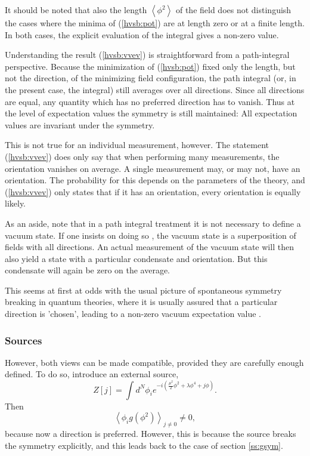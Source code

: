 \documentclass[final,twoside,12pt]{article}
\newcommand*{\no}{\noindent}
\newcommand*{\be}{\begin{equation}}
\newcommand*{\ee}{\end{equation}}
\newcommand*{\pref}[1]{(\ref{#1})}
\newcommand*{\nn}{\nonumber}
\newcommand*{\1}{1\!\!\!\bot}
\newcommand*{\la}{\left\langle}
\newcommand*{\ra}{\right\rangle}
\begin{document}
It should be noted that also the length $\la\phi^2\ra$ of the field does not distinguish the cases where the minima of \pref{hvsb:pot} are at length zero or at a finite length. In both cases, the explicit evaluation of the integral gives a non-zero value.

Understanding the result \pref{hvsb:vvev} is straightforward from a path-integral perspective. Because the minimization of \pref{hvsb:pot} fixed only the length, but not the direction, of the minimizing field configuration, the path integral (or, in the present case, the integral) still averages over all directions. Since all directions are equal, any quantity which has no preferred direction has to vanish. Thus at the level of expectation values the symmetry is still maintained: All expectation values are invariant under the symmetry.

This is not true for an individual measurement, however. The statement \pref{hvsb:vvev} does only say that when performing many measurements, the orientation vanishes on average. A single measurement may, or may not, have an orientation. The probability for this depends on the parameters of the theory, and \pref{hvsb:vvev} only states that if it has an orientation, every orientation is equally likely.

As an aside, note that in a path integral treatment it is not necessary to define a vacuum state. If one insists on doing so \cite{Weinberg:1996kr}, the vacuum state is a superposition of fields with all directions. An actual measurement of the vacuum state will then also yield a state with a particular condensate and orientation. But this condensate will again be zero on the average.

This seems at first at odds with the usual picture of spontaneous symmetry breaking in quantum theories, where it is usually assured that a particular direction is 'chosen', leading to a non-zero vacuum expectation value \cite{Bohm:2001yx}.

\subsubsection{Sources}

However, both views can be made compatible, provided they are carefully enough defined. To do so, introduce an external source,
\be
Z[j]=\int d^N\phi_i e^{-i\left(\frac{\mu^2}{2}\phi^2+\lambda\phi^4+j\phi\right)}\label{d0model}.
\ee
\no Then
\be
\la\phi_i g(\phi^2)\ra_{j\neq 0}\neq 0\nn,
\ee
\no because now a direction is preferred. However, this is because the source breaks the symmetry explicitly, and this leads back to the case of section \ref{ss:gsym}. 
\end{document}
